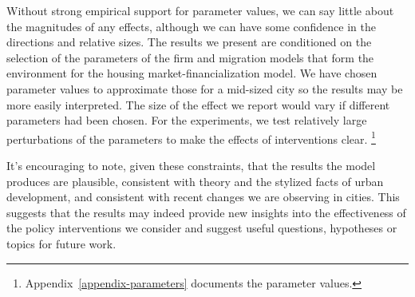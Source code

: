 Without strong empirical support for parameter values, we can say little about the magnitudes of any effects, although we can have some confidence in the directions and relative sizes.  
The results we present are conditioned on the selection of the parameters of the firm and migration models that form the environment for the housing market-financialization model. We have chosen parameter values to approximate those for a mid-sized city so the results may be more easily interpreted.  The size of the effect we report would vary if different parameters had been chosen. %
For the experiments, we test relatively large perturbations of the parameters to make the effects of interventions clear. \footnote{Appendix~\ref{appendix-parameters} documents the parameter values.} 

It's encouraging to note, given these constraints, that the results the model produces are plausible, consistent with theory and the stylized facts of urban development, and consistent with recent changes we are observing in cities.
This suggests that the results may indeed provide new insights into the effectiveness of the policy interventions we consider and suggest useful questions, hypotheses or topics for future work. 


%



